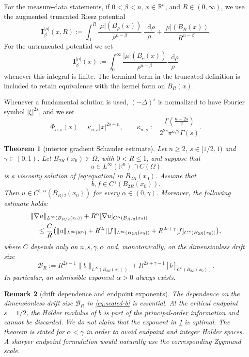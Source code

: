 \documentclass[10pt,a4paper]{amsart}
\numberwithin{equation}{section}
\newtheorem{theorem}{Theorem}[section]
\newtheorem{remark}[theorem]{Remark}
\newcommand{\R}{\mathbb R}
\newcommand{\I}{\mathbf I}
\newcommand{\differential}{\mathop{}\!\mathrm d}
\begin{document}
For the measure-data statements, if $0<\beta<n$, $x\in\R^n$, and
$R\in(0,\infty)$, we use the augmented truncated Riesz potential
\begin{equation}\label{eq:riesz-potential-main}
 \I_\beta^{|\mu|}(x,R)
 :=\int_0^R
 \frac{|\mu|(B_\rho(x))}{\rho^{n-\beta}}\,\frac{\differential\rho}{\rho}
 +\frac{|\mu|(B_R(x))}{R^{n-\beta}}.
\end{equation}
For the untruncated potential we set
\[
 \I_\beta^{|\mu|}(x)
 :=\int_0^\infty
 \frac{|\mu|(B_\rho(x))}{\rho^{n-\beta}}
 \frac{\differential\rho}{\rho}
\]
whenever this integral is finite.  The terminal term in the truncated
definition is included to retain equivalence with the kernel
form on $B_R(x)$.

Whenever a fundamental solution is used, $(-\Delta)^s$ is normalized to
have Fourier symbol $|\xi|^{2s}$, and we set
\begin{equation}\label{eq:fundamental-normalized}
 \Phi_{n,s}(x)=\kappa_{n,s}|x|^{2s-n},\qquad
 \kappa_{n,s}:=
 \frac{\Gamma\!\left(\frac{n-2s}{2}\right)}
 {2^{2s}\pi^{n/2}\Gamma(s)}.
\end{equation}

\begin{theorem}[interior gradient Schauder estimate]\label{thm:main}
Let $n\ge2$, $s\in[1/2,1)$ and $\gamma\in(0,1)$.  Let
$B_{2R}(x_0)\Subset\Omega$, with $0<R\le1$, and suppose that
\[
 u\in L^\infty(\R^n)\cap C(\Omega)
\]
is a viscosity solution of \eqref{eq:equation} in $B_{2R}(x_0)$.
Assume that
\[
 b,f\in C^\gamma(B_{2R}(x_0)).
\]
Then $u\in C^{1,\alpha}(B_{R/2}(x_0))$ for every
$\alpha\in(0,\gamma)$.  Moreover, the following estimate holds:
\begin{align}\label{eq:main-estimate}
 &\|\nabla u\|_{L^\infty(B_{R/2}(x_0))}
 +R^\alpha[\nabla u]_{C^\alpha(B_{R/2}(x_0))}\notag\\
 &\quad\le \frac{C}{R}\bigl(
 \|u\|_{L^\infty(\R^n)}
 +R^{2s}\|f\|_{L^\infty(B_{2R}(x_0))}
 +R^{2s+\gamma}[f]_{C^\gamma(B_{2R}(x_0))}\bigr),
\end{align}
where $C$ depends only on $n,s,\gamma,\alpha$ and, monotonically, on the
dimensionless drift size
\begin{equation}\label{eq:scaled-b}
 \mathcal B_R:=R^{2s-1}\|b\|_{L^\infty(B_{2R}(x_0))}
 +R^{2s+\gamma-1}[b]_{C^\gamma(B_{2R}(x_0))}.
\end{equation}
In particular, an admissible exponent $\alpha>0$ always exists.
\end{theorem}

\begin{remark}[drift dependence and endpoint exponents]
The dependence on the dimensionless drift size $\mathcal B_R$ in
\eqref{eq:scaled-b} is essential.  At the critical endpoint $s=1/2$, the
H\"older modulus of $b$ is part of the principal-order information and
cannot be discarded.  We do not claim that the exponent in
\cref{thm:main} is optimal.  The theorem is stated for $\alpha<\gamma$ in
order to avoid endpoint and integer H\"older spaces.  A sharper endpoint
formulation would naturally use the corresponding Zygmund scale.
\end{remark}
\end{document}
